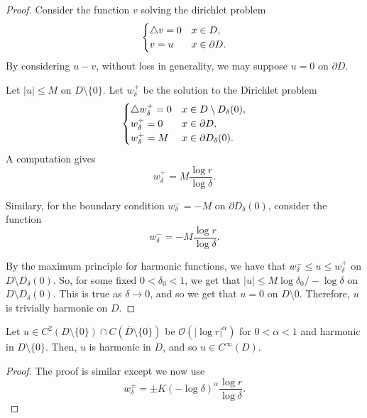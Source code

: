 \begin{proof}
Consider the function $v$ solving the dirichlet problem
\begin{equation}
\begin{cases}
\triangle v = 0 & x \in D,\\
v = u & x\in \partial D.
\end{cases}
\end{equation}
By considering $u - v$, without loss in generality, we may suppose $u = 0$ on $\partial D$.

Let $|u|\leq M$ on $D\setminus\{0\}$. Let $w_\delta^+$ be the solution to the Dirichlet problem
\begin{equation}
\begin{cases}
\triangle w_\delta^+ = 0 & x \in D\setminus D_\delta(0),\\
w_\delta^+ = 0 & x\in \partial D,\\
w_\delta^+ = M & x\in \partial D_\delta(0).
\end{cases}
\end{equation}
A computation gives
\begin{equation}
w_\delta^+ = M\frac{\log r}{\log\delta}.
\end{equation}

Similary, for the boundary condition $w_\delta^- = -M$ on $\partial D_\delta(0)$, consider the function
\begin{equation}
w_\delta^- = -M\frac{\log r}{\log\delta}.
\end{equation}

By the maximum principle for harmonic functions, we have that $w_\delta^- \leq u \leq w_\delta^+$ on $D \setminus D_\delta(0)$. So, for some fixed $0<\delta_0<1$, we get that $|u| \leq M \log\delta_0 / -\log\delta$ on $D\setminus D_\delta(0)$. This is true as $\delta\to 0$, and so we get that $u=0$ on $D\setminus 0$. Therefore, $u$ is trivially harmonic on $D$.
\end{proof}

\begin{proposition}
Let $u \in C^2(D\setminus\{0\})\cap C(\bar D\setminus \{0\})$ be $\mathcal O (|\log r|^\alpha)$ for $0<\alpha<1$ and harmonic in $D\setminus\{0\}$. Then, $u$ is harmonic in $D$, and so $u\in C^\infty(D)$.
\end{proposition}

\begin{proof}
The proof is similar except we now use
\begin{equation}
w_\delta^\pm = \pm K(-\log\delta)^\alpha \frac{\log r}{\log \delta}.
\end{equation}
\end{proof}


